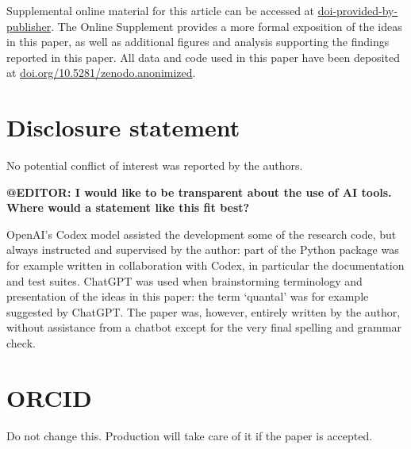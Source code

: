 \documentclass{tMAM2e}%
\theoremstyle{plain}
\theoremstyle{definition}
\theoremstyle{remark}
\begin{document}
Supplemental online material for this article can be accessed at \url{doi-provided-by-publisher}.
The Online Supplement provides a more formal exposition of the ideas in this paper, as well as additional figures and analysis supporting the findings reported in this paper.
All data and code used in this paper have been deposited at \url{doi.org/10.5281/zenodo.anonimized}.


\section*{Disclosure statement}

No potential conflict of interest was reported by the authors. 

{\bigbreak\noindent\color{red}%
  \textbf{@EDITOR: I would like to be transparent about the use of AI tools. 
Where would a statement like this fit best?}

  OpenAI’s Codex model assisted the development some of the research code, but always instructed and supervised by the author: part of the Python package was for example written in collaboration with Codex, in particular the documentation and test suites. 
ChatGPT was used when brainstorming terminology and presentation of the ideas in this paper: the term ‘quantal’ was for example suggested by ChatGPT. 
The paper was, however, entirely written by the author, without assistance from a chatbot except for the very final spelling and grammar check.
}

\section*{ORCID}

Do not change this. Production will take care of it if the paper is accepted.



\end{document}
